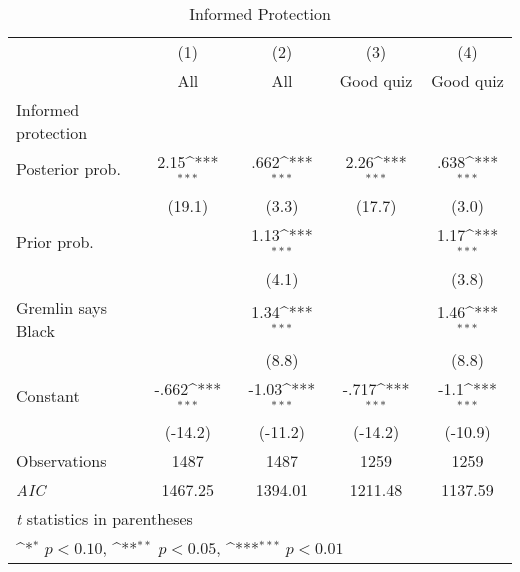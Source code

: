 \begin{table}[htbp]\centering
\def\sym#1{\ifmmode^{#1}\else\(^{#1}\)\fi}
\caption{Informed Protection}
\begin{tabular}{l*{4}{c}}
\hline\hline
                &\multicolumn{1}{c}{(1)}&\multicolumn{1}{c}{(2)}&\multicolumn{1}{c}{(3)}&\multicolumn{1}{c}{(4)}\\
                &\multicolumn{1}{c}{All}&\multicolumn{1}{c}{All}&\multicolumn{1}{c}{Good quiz}&\multicolumn{1}{c}{Good quiz}\\
\hline
Informed protection&                  &                  &                  &                  \\
Posterior prob. &     2.15\sym{***}&     .662\sym{***}&     2.26\sym{***}&     .638\sym{***}\\
                &   (19.1)         &    (3.3)         &   (17.7)         &    (3.0)         \\
Prior prob.     &                  &     1.13\sym{***}&                  &     1.17\sym{***}\\
                &                  &    (4.1)         &                  &    (3.8)         \\
Gremlin says Black&                  &     1.34\sym{***}&                  &     1.46\sym{***}\\
                &                  &    (8.8)         &                  &    (8.8)         \\
Constant        &    -.662\sym{***}&    -1.03\sym{***}&    -.717\sym{***}&     -1.1\sym{***}\\
                &  (-14.2)         &  (-11.2)         &  (-14.2)         &  (-10.9)         \\
\hline
Observations    &     1487         &     1487         &     1259         &     1259         \\
\textit{AIC}    &  1467.25         &  1394.01         &  1211.48         &  1137.59         \\
\hline\hline
\multicolumn{5}{l}{\footnotesize \textit{t} statistics in parentheses}\\
\multicolumn{5}{l}{\footnotesize \sym{*} \(p<0.10\), \sym{**} \(p<0.05\), \sym{***} \(p<0.01\)}\\
\end{tabular}
\end{table}
